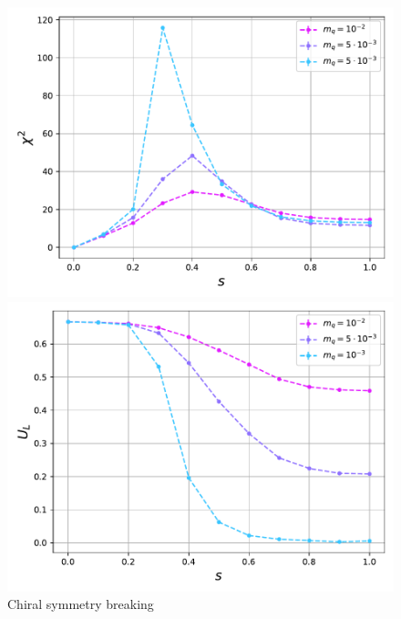\begin{figure}[h]
\begin{minipage}{0.45\textwidth}
	\includegraphics[scale=0.48]{figures/chiral_PT/susceptibility.pdf}
\end{minipage}
\hfill
\begin{minipage}{0.45\textwidth}
	\includegraphics[scale=0.48]{figures/chiral_PT/binder.pdf}
\end{minipage}
\hfill
\caption{Chiral symmetry breaking}
\label{fig:chiral:symmetry_breaking}
\end{figure}


